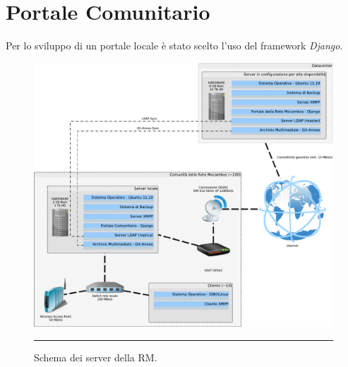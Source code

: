 \section{Portale Comunitario}
Per lo sviluppo di un portale locale è stato scelto l'uso del framework \emph{Django}.

\begin{figure}[htbp]
  \centering
  \includegraphics[width=\textwidth]{./Figure/SchemaServer_ReteMocambos-crop.pdf}
  \rule{35em}{0.5pt}
  \caption[Schema dei server della RM]{Schema dei server della RM.}
  \label{fig:SchemaServer_ReteMocambos}
\end{figure}
